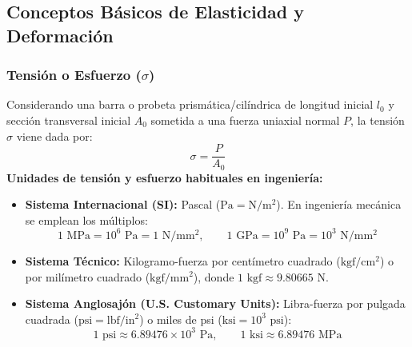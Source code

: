 \subsection{Conceptos Básicos de Elasticidad y Deformación}

\subsubsection{Tensión o Esfuerzo ($\sigma$)}

Considerando una barra o probeta prismática/cilíndrica de longitud inicial $l_0$ y sección transversal inicial $A_0$ sometida a una fuerza uniaxial normal $P$, la tensión $\sigma$ viene dada por:
\begin{equation}
    \sigma = \frac{P}{A_0}
    \label{eq:tension_nominal}
\end{equation}
\textbf{Unidades de tensión y esfuerzo habituales en ingeniería:}
\begin{itemize}
    \item \textbf{Sistema Internacional (SI):} Pascal ($\text{Pa} = \text{N}/\text{m}^2$). En ingeniería mecánica se emplean los múltiplos:
          \begin{equation*}
              1\text{ MPa} = 10^6\text{ Pa} = 1\text{ N}/\text{mm}^2, \qquad 1\text{ GPa} = 10^9\text{ Pa} = 10^3\text{ N}/\text{mm}^2
          \end{equation*}
    \item \textbf{Sistema Técnico:} Kilogramo-fuerza por centímetro cuadrado ($\text{kgf}/\text{cm}^2$) o por milímetro cuadrado ($\text{kgf}/\text{mm}^2$), donde $1\text{ kgf} \approx 9.80665\text{ N}$.
    \item \textbf{Sistema Anglosajón (U.S. Customary Units):} Libra-fuerza por pulgada cuadrada ($\text{psi} = \text{lbf}/\text{in}^2$) o miles de psi ($\text{ksi} = 10^3\text{ psi}$):
          \begin{equation*}
              1\text{ psi} \approx 6.89476 \times 10^3\text{ Pa}, \qquad 1\text{ ksi} \approx 6.89476\text{ MPa}
          \end{equation*}
\end{itemize}

